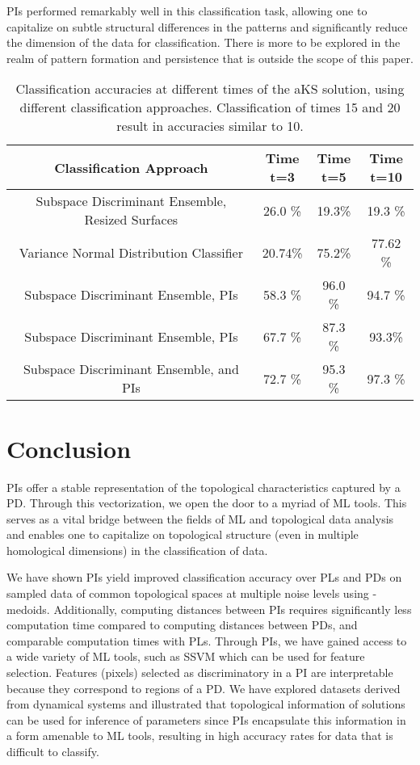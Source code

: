 \documentclass[11pt]{article}
\begin{document}
PIs performed remarkably well in this classification task, allowing one to capitalize on subtle structural differences in the patterns and significantly reduce the dimension of the data for classification. There is more to be explored in the realm of pattern formation and persistence that is outside the scope of this paper.


\begin{table}[t!]
\centering
\caption{Classification accuracies at different times of the aKS solution, using different classification approaches. Classification of times  15 and 20 result in accuracies similar to 10.}
\begin{tabular}{|c|c|c|c|}   
\hline   
\bfseries{Classification Approach}& \shortstack{Time \\t=3} & \shortstack{Time \\t=5} & \shortstack{Time \\t=10} \\
\hline \hline
Subspace Discriminant Ensemble, Resized Surfaces & 26.0 \% & 19.3\% & 19.3 \% \\
\hline
 Variance Normal Distribution Classifier & 20.74\% & 75.2\%  & 77.62 \% \\
\hline
\hline
Subspace Discriminant Ensemble,  PIs & 58.3 \% & 96.0 \% & 94.7 \% \\
\hline
Subspace Discriminant Ensemble,  PIs & 67.7 \% & 87.3 \% & 93.3\% \\
\hline
Subspace Discriminant Ensemble,  and  PIs & 72.7 \% & 95.3 \%  &  97.3 \% \\
\hline

\end{tabular}
\label{aksresults}
\end{table}




\section{Conclusion}
PIs offer a stable representation of the topological characteristics captured by a PD. Through this vectorization, we open the door to a myriad of ML tools. This serves as a vital bridge between the fields of ML and topological data analysis and enables one to capitalize on topological structure (even in multiple homological dimensions) in the classification of data. 

We have shown PIs yield improved classification accuracy over PLs and PDs on sampled data of common topological spaces at multiple noise levels using -medoids. Additionally, computing distances between PIs requires significantly less computation time compared to computing distances between PDs, and comparable computation times with PLs. Through PIs, we have gained access to a wide variety of ML tools, such as SSVM which can be used for feature selection. Features (pixels) selected as discriminatory in a PI are interpretable because they correspond to regions of a PD. We have explored datasets derived from dynamical systems and illustrated that topological information of solutions can be used for inference of parameters since PIs encapsulate this information in a form amenable to ML tools, resulting in high accuracy rates for data that is difficult to classify. 
\end{document}
